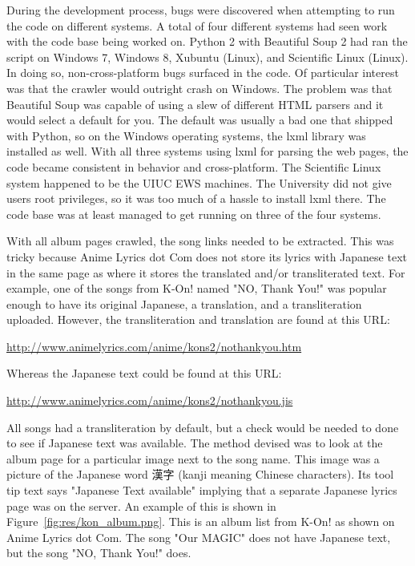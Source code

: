 \documentclass{acm} %
\begin{document}
\begin{CJK}{UTF8}{zhsong}
During the development process, bugs were discovered when attempting to run the code on different systems. A total of four different systems had seen work with the code base being worked on. Python 2 with Beautiful Soup 2 had ran the script on Windows 7, Windows 8, Xubuntu (Linux), and Scientific Linux (Linux). In doing so, non-cross-platform bugs surfaced in the code. Of particular interest was that the crawler would outright crash on Windows. The problem was that Beautiful Soup was capable of using a slew of different HTML parsers and it would select a default for you. The default was usually a bad one that shipped with Python, so on the Windows operating systems, the lxml library was installed as well. With all three systems using lxml for parsing the web pages, the code became consistent in behavior and cross-platform. The Scientific Linux system happened to be the UIUC EWS machines. The University did not give users root privileges, so it was too much of a hassle to install lxml there. The code base was at least managed to get running on three of the four systems.

With all album pages crawled, the song links needed to be extracted. This was tricky because Anime Lyrics dot Com does not store its lyrics with Japanese text in the same page as where it stores the translated and/or transliterated text. For example, one of the songs from K-On! named "NO, Thank You!" was popular enough to have its original Japanese, a translation, and a transliteration uploaded. However, the transliteration and translation are found at this URL:

\url{http://www.animelyrics.com/anime/kons2/nothankyou.htm}

Whereas the Japanese text could be found at this URL:

\url{http://www.animelyrics.com/anime/kons2/nothankyou.jis}

All songs had a transliteration by default, but a check would be needed to done to see if Japanese text was available. The method devised was to look at the album page for a particular image next to the song name. This image was a picture of the Japanese word 漢字 (kanji meaning Chinese characters). Its tool tip text says "Japanese Text available" implying that a separate Japanese lyrics page was on the server. An example of this is shown in Figure~\ref{fig:res/kon_album.png}. This is an album list from K-On! as shown on Anime Lyrics dot Com. The song "Our MAGIC" does not have Japanese text, but the song "NO, Thank You!" does.


\end{CJK}
\end{document}
